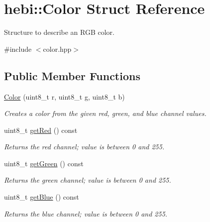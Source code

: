 \hypertarget{structhebi_1_1Color}{}\section{hebi\+:\+:Color Struct Reference}
\label{structhebi_1_1Color}


Structure to describe an R\+GB color.  




{\ttfamily \#include $<$color.\+hpp$>$}

\subsection*{Public Member Functions}
\begin{DoxyCompactItemize}
\item 
\hyperlink{structhebi_1_1Color_aa7cad37a99b993eea058d455bbcc4a82}{Color} (uint8\+\_\+t r, uint8\+\_\+t g, uint8\+\_\+t b)
\begin{DoxyCompactList}\small\item\em Creates a color from the given red, green, and blue channel values. \end{DoxyCompactList}\item 
\mbox{\label{structhebi_1_1Color_a05e1f399b63c4c365455a8e90fb2a06d}} 
uint8\+\_\+t \hyperlink{structhebi_1_1Color_a05e1f399b63c4c365455a8e90fb2a06d}{get\+Red} () const
\begin{DoxyCompactList}\small\item\em Returns the red channel; value is between 0 and 255. \end{DoxyCompactList}\item 
\mbox{\label{structhebi_1_1Color_a80b95836bdf01b53ed834741655394bf}} 
uint8\+\_\+t \hyperlink{structhebi_1_1Color_a80b95836bdf01b53ed834741655394bf}{get\+Green} () const
\begin{DoxyCompactList}\small\item\em Returns the green channel; value is between 0 and 255. \end{DoxyCompactList}\item 
\mbox{\label{structhebi_1_1Color_ae1b245d67effdf821141ab7f85cc036b}} 
uint8\+\_\+t \hyperlink{structhebi_1_1Color_ae1b245d67effdf821141ab7f85cc036b}{get\+Blue} () const
\begin{DoxyCompactList}\small\item\em Returns the blue channel; value is between 0 and 255. \end{DoxyCompactList}\end{DoxyCompactItemize}


